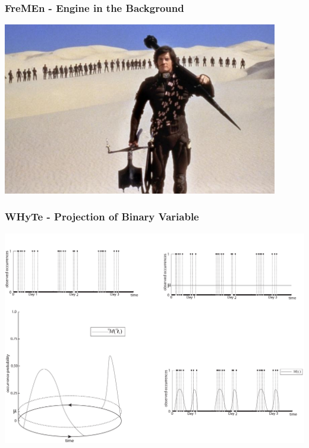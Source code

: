 
\begin{frame}
	\frametitle{FreMEn - Engine in the Background}
    \vspace{3mm}
    \href{run:./video/pitch.mkv}{\includegraphics[width=0.9\textwidth]{fig/fremen_backgroung.jpeg}}
\end{frame}



\begin{frame}
	\frametitle{WHyTe - Projection of Binary Variable}
    \vspace{3mm}
            \includegraphics[width=1.0\textwidth]{fig/hypertime_graphs_a.pdf}
\end{frame}




